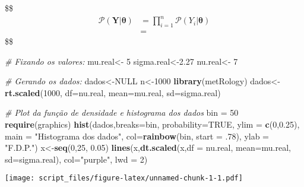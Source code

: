 \documentclass[]{article}
\newenvironment{Shaded}{\begin{snugshade}}{\end{snugshade}}
\newcommand{\CommentTok}[1]{\textcolor[rgb]{0.56,0.35,0.01}{\textit{#1}}}
\newcommand{\DataTypeTok}[1]{\textcolor[rgb]{0.13,0.29,0.53}{#1}}
\newcommand{\DecValTok}[1]{\textcolor[rgb]{0.00,0.00,0.81}{#1}}
\newcommand{\FloatTok}[1]{\textcolor[rgb]{0.00,0.00,0.81}{#1}}
\newcommand{\KeywordTok}[1]{\textcolor[rgb]{0.13,0.29,0.53}{\textbf{#1}}}
\newcommand{\NormalTok}[1]{#1}
\newcommand{\OtherTok}[1]{\textcolor[rgb]{0.56,0.35,0.01}{#1}}
\newcommand{\StringTok}[1]{\textcolor[rgb]{0.31,0.60,0.02}{#1}}
\begin{document}
\$\$ \begin{align}
\mathcal{P}(\pmb{Y}|\pmb{\theta}) 
& = \prod_{i=1}^{n}\mathcal{P}(Y_i|\pmb{\theta}) \\
& =

\end{align} \$\$

\begin{Shaded}
\begin{Highlighting}[]
\CommentTok{# Fixando os valores:}
\NormalTok{mu.real<-}\StringTok{ }\DecValTok{5}
\NormalTok{sigma.real<-}\FloatTok{2.27}
\NormalTok{nu.real<-}\StringTok{ }\DecValTok{7}

\CommentTok{# Gerando os dados:}
\NormalTok{dados<-}\OtherTok{NULL}
\NormalTok{n<-}\DecValTok{1000}
\KeywordTok{library}\NormalTok{(metRology)}
\NormalTok{dados<-}\KeywordTok{rt.scaled}\NormalTok{(}\DecValTok{1000}\NormalTok{, }\DataTypeTok{df=}\NormalTok{nu.real, }\DataTypeTok{mean=}\NormalTok{mu.real, }\DataTypeTok{sd=}\NormalTok{sigma.real)}

\CommentTok{# Plot da função de densidade e histograma dos dados}
\NormalTok{bin =}\StringTok{ }\DecValTok{50}
\KeywordTok{require}\NormalTok{(graphics)}
\KeywordTok{hist}\NormalTok{(dados,}\DataTypeTok{breaks=}\NormalTok{bin, }\DataTypeTok{probability=}\OtherTok{TRUE}\NormalTok{, }\DataTypeTok{ylim =} \KeywordTok{c}\NormalTok{(}\DecValTok{0}\NormalTok{,}\FloatTok{0.25}\NormalTok{),}
     \DataTypeTok{main =} \StringTok{"Histograma dos dados"}\NormalTok{, }\DataTypeTok{col=}\KeywordTok{rainbow}\NormalTok{(bin, }\DataTypeTok{start =} \FloatTok{.78}\NormalTok{), }\DataTypeTok{ylab =} \StringTok{"F.D.P."}\NormalTok{)}
\NormalTok{x<-}\KeywordTok{seq}\NormalTok{(}\DecValTok{0}\NormalTok{,}\DecValTok{25}\NormalTok{, }\FloatTok{0.05}\NormalTok{)}
\KeywordTok{lines}\NormalTok{(x,}\KeywordTok{dt.scaled}\NormalTok{(x,}\DataTypeTok{df =}\NormalTok{ nu.real, }\DataTypeTok{mean=}\NormalTok{mu.real,}
                  \DataTypeTok{sd=}\NormalTok{sigma.real), }\DataTypeTok{col=}\StringTok{"purple"}\NormalTok{, }\DataTypeTok{lwd =} \DecValTok{2}\NormalTok{)}
\end{Highlighting}
\end{Shaded}

\texttt{[image: script\_files/figure-latex/unnamed-chunk-1-1.pdf]}
\end{document}
